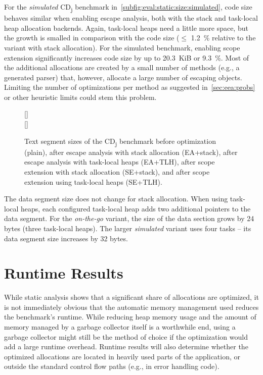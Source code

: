 		For the \emph{simulated} CD\textsubscript{j} benchmark in~\cref{subfig:eval:static:size:simulated}, code size
		behaves similar when enabling escape analysis, both with the stack and task-local heap allocation backends. Again,
		task-local heaps need a little more space, but the growth is smalled in comparison with the code size ($\le$ 1.2~\%
		relative to the variant with stack allocation). For the simulated benchmark, enabling scope extension significantly
		increases code size by up to 20.3~KiB or 9.3~\%. Most of the additional allocations are created by a small number of
		methods (e.g., a generated parser) that, however, allocate a large number of escaping objects. Limiting the number
		of optimizations per method as suggested in~\cref{sec:eea:probs} or other heuristic limits could stem this problem.

		\begin{figure}
			\centering
			[\textwidth]{%
				\centering%
			}\\[2ex]
			[\textwidth]{%
				\centering%
			}%
			\caption[CD\textsubscript{j} text segment sizes]{%
				Text segment sizes of the CD\textsubscript{j} benchmark before optimization (plain), after escape analysis with
				stack allocation (EA+stack), after escape analysis with task-local heaps (EA+TLH), after scope extension with
				stack allocation (SE+stack), and after scope extension using task-local heaps (SE+TLH).}%
			\label{fig:eval:static:size}
		\end{figure}

		The data segment size does not change for stack allocation. When using task-local heaps, each configured task-local
		heap adds two additional pointers to the data segment. For the \emph{on-the-go} variant, the size of the data
		section grows by 24 bytes (three task-local heaps). The larger \emph{simulated} variant uses four tasks – its data
		segment size increases by 32 bytes.

	\section{Runtime Results}
		\label{sec:eval:runtime}
		While static analysis shows that a significant share of allocations are optimized, it is not immediately obvious
		that the automatic memory management used reduces the benchmark's runtime. While reducing heap memory usage and the
		amount of memory managed by a garbage collector itself is a worthwhile end, using a garbage collector might still be
		the method of choice if the optimization would add a large runtime overhead. Runtime results will also determine
		whether the optimized allocations are located in heavily used parts of the application, or outside the standard
		control flow paths (e.g., in error handling code).

